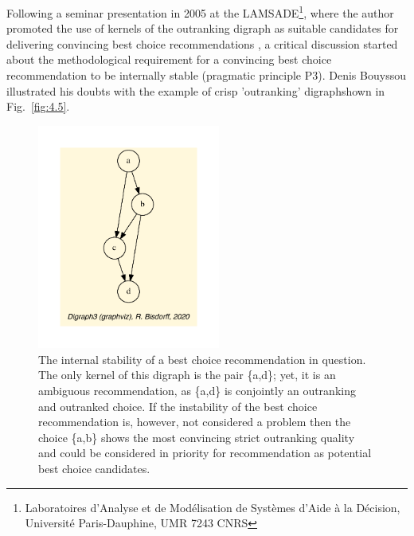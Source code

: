 Following a seminar presentation in 2005 at the LAMSADE\footnote{Laboratoires d'Analyse et de Modélisation de Systèmes d'Aide à la Décision, Université Paris-Dauphine, UMR 7243 CNRS}, where the author promoted the use of kernels of the outranking digraph as suitable candidates for delivering convincing best choice recommendations \citep{BIS-2005}, a critical discussion started about the methodological requirement for a convincing best choice recommendation to be internally stable (pragmatic principle P3). Denis Bouyssou illustrated his doubts with the example of crisp 'outranking' digraphshown in Fig.~\vref{fig:4.5}.
\begin{figure}[h]
\sidecaption[t]
\includegraphics[width=6cm]{Figures/bouyssou11Oct05crisp.pdf}
\caption{The internal stability of a best choice recommendation in question. The only kernel of this digraph is the pair \{a,d\}; yet, it is an ambiguous recommendation, as \{a,d\} is conjointly an outranking and outranked choice. If the instability of the best choice recommendation is, however, not considered a problem then the choice \{a,b\} shows the most convincing strict outranking quality and could be considered in priority for recommendation as potential best choice candidates.}
\label{fig:4.5}       %
\end{figure}

